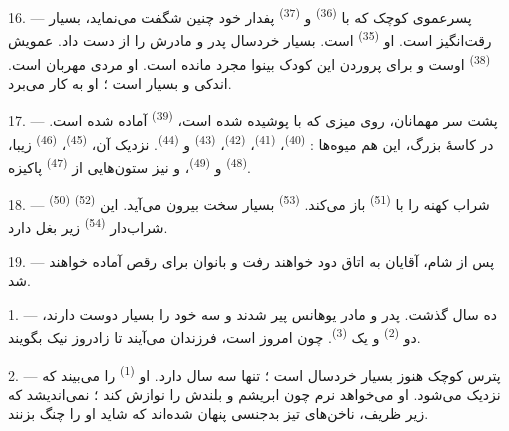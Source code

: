 16. --- پسرعموی کوچک که با  \textsuperscript{(36)} و
 \textsuperscript{(37)} پفدار خود چنین شگفت می‌نماید،
بسیار رقت‌انگیز است. او  \textsuperscript{(35)} است.
بسیار خردسال پدر و مادرش را از دست داد. عمویش 
\textsuperscript{(38)} اوست و برای پروردن این کودک بینوا مجرد مانده
است. او مردی مهربان است. اندکی  و بسیار
 است ؛ او  به کار می‌برد.

\VUsaut{2.4mm}
\VUsaut{3.0mm}

17. --- پشت سر مهمانان، روی میزی که با  پوشیده شده است،
 \textsuperscript{(39)} آماده شده است. در کاسهٔ بزرگ، این
هم میوه‌ها :  \textsuperscript{(40)}، 
\textsuperscript{(41)}،  \textsuperscript{(42)}،
 \textsuperscript{(43)} و 
\textsuperscript{(44)}. نزدیک آن، 
\textsuperscript{(45)}،  \textsuperscript{(46)} زیبا،
 \textsuperscript{(48)} و 
\textsuperscript{(49)}، و نیز ستون‌هایی از 
\textsuperscript{(47)} پاکیزه.

18. ---  \textsuperscript{(50)} 
\textsuperscript{(52)} شراب کهنه را با 
\textsuperscript{(51)} باز می‌کند. 
\textsuperscript{(53)} بسیار سخت بیرون می‌آید. این شراب‌دار
 \textsuperscript{(54)} زیر بغل دارد.

19. --- پس از شام، آقایان به اتاق دود خواهند رفت و بانوان برای رقص آماده
خواهند شد.

\VUsaut{5.0mm}
\VUsaut{1.6mm}
\VUsaut{2.6mm}

\VUsaut{3.0mm}

1. --- ده سال گذشت. پدر و مادر یوهانس پیر شدند و سه  خود
را بسیار دوست دارند، دو  \textsuperscript{(2)} و یک
 \textsuperscript{(3)}. چون امروز  است، فرزندان می‌آیند تا زادروز نیک بگویند.

2. --- پترس کوچک هنوز بسیار خردسال است ؛ تنها سه سال دارد. او
 \textsuperscript{(1)} را می‌بیند که نزدیک می‌شود. او
می‌خواهد  نرم چون ابریشم و  بلندش را نوازش
کند ؛ نمی‌اندیشد که زیر  ظریف، ناخن‌های تیز بدجنسی پنهان
شده‌اند که شاید او را چنگ بزنند.

